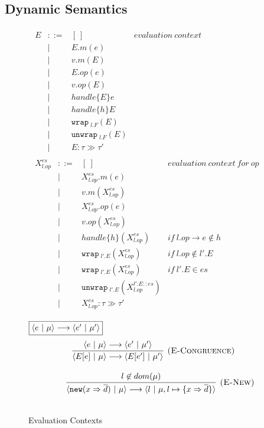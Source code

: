 \documentclass{article}
\theoremstyle{definition}
\newcommand{\keywadj}[1]{\mathtt{#1}}
\newcommand{\keyw}[1]{\keywadj{#1}~}
\begin{document}
\subsection{Dynamic Semantics}
\label{sec-dynamic}
\begin{figure}[H]
\flushleft



\footnotesize{

\[
\begin{array}{lll}
\begin{array}{lllr}
E & ::= & [~] & \mathit{evaluation~context}\\
  & |   & E.m(e)\\
	  & |   & v.m(E)\\
	  & |   & E.op(e)\\
	  & |   &  v.op(E)\\
  & |   & handle\{E\}e \\

  & |   & handle\{h\}E \\
  & | & \keyw{wrap}_{l.F}(E)\\
  & | & \keyw{unwrap}_{l.F}(E)\\
  & | & E : \tau \gg \tau'  \\
\end{array}
\begin{array}{lllr}

X^{es}_{l.op} & ::= &[~] & \mathit{evaluation~context~for~op}\\
  & |  &  X^{es}_{l.op}.m(e)\\
  & | &  v.m(X^{es}_{l.op})\\
    & |  &  X^{es}_{l.op}.op(e)\\
  & | &  v.op(X^{es}_{l.op})\\
  & | & handle\{h\} (X^{es}_{l.op}) &\mathit{if~l.op \rightarrow e \not\in h}\\
   & | & \keyw{wrap}_{l'.E}(X^{es}_{l.op})  &\mathit{if~l.op \not\in l'.E}\\
  & | & \keyw{wrap}_{l'.E}(X^{es}_{l.op})   &\mathit{if~l'.E \in es}  \\

  & | & \keyw{unwrap}_{l'.E}(X^{l'.E::es}_{l.op}) \\
   & | & X^{es}_{l.op} : \tau \gg \tau' 

\
\end{array}
\end{array}
\]


\caption{Evaluation Contexts}

$\fbox{$\langle e~|~\mu \rangle \longrightarrow \langle e'~|~\mu' \rangle$}$
\[
\begin{array}{c}
\infer[\textsc{(E-Congruence)}]
  {\langle E[e]~|~\mu \rangle \longrightarrow \langle E[e']~|~\mu' \rangle}
  {\langle e~|~\mu \rangle \longrightarrow \langle e'~|~\mu' \rangle} \\[3ex]
~~~~~
\infer[\textsc{(E-New)}]
  {\langle \keywadj{new} (x \Rightarrow \overline{d})~|~\mu \rangle \longrightarrow \langle l~|~\mu, l \mapsto \{ x \Rightarrow \overline{d} \} \rangle}
  {l \not\in dom(\mu)}\\[3ex]



\end{array}\]}
\end{figure}
\end{document}
